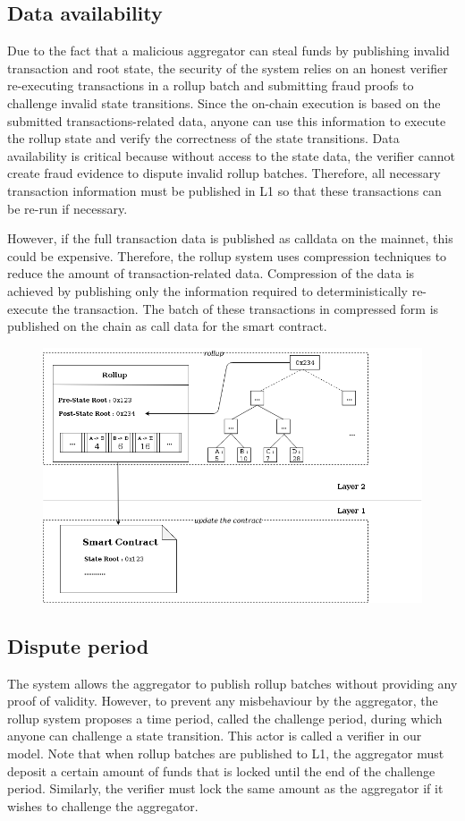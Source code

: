 \documentclass{article}
\begin{document}
\subsection{Data availability}

Due to the fact that a malicious aggregator can steal funds by publishing invalid transaction and root state, the security of the system relies on an honest verifier re-executing transactions in a rollup batch and submitting fraud proofs to challenge invalid state transitions. Since the on-chain execution is based on the submitted transactions-related data, anyone can use this information to execute the rollup state and verify the correctness of the state transitions.
Data availability is critical because without access to the state data, the verifier cannot create fraud evidence to dispute invalid rollup batches. Therefore, all necessary transaction information must be published in L1 so that these transactions can be re-run if necessary.

However, if the full transaction data is published as calldata on the mainnet, this could be expensive. Therefore, the rollup system uses compression techniques to reduce the amount of transaction-related data. Compression of the data is achieved by publishing only the information required to deterministically re-execute the transaction. The batch of these transactions in compressed form is published on the chain as call data for the smart contract.
\begin{figure}[t]
\includegraphics[width=12cm]{rollup-batch-data}
\centering
\label{rollup-batch-data}
\end{figure}
\subsection{Dispute period}
The system allows the aggregator to publish rollup batches without providing any proof of validity. However, to prevent any misbehaviour by the aggregator, the rollup system proposes a time period, called the challenge period, during which anyone can challenge a state transition. This actor is called a verifier in our model. Note that when rollup batches are published to L1, the aggregator must deposit a certain amount of funds that is locked until  the end of the challenge period. Similarly, the verifier must lock the same amount as the aggregator if it wishes to challenge the aggregator.
\end{document}
